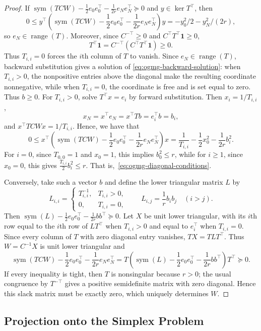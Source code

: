\documentclass[11pt]{article}
\begin{document}
\begin{proof}
If $\operatorname{sym}(TCW)-\frac12e_0e_0^\top
-\frac1{2r}e_Ne_N^\top \succeq0$ and $y\in\ker T^\top$, then
$$0\leq y^\top \left(\operatorname{sym}(TCW)-\frac12e_0e_0^\top
-\frac1{2r}e_Ne_N^\top\right)y=-y_0^2/2-y_N^2/(2r),$$
so $e_N\in\operatorname{range}(T)$.
Moreover, since $C^{-\top}\geq0$ and $C^\top T^\top\mathbf1\geq0$,
\[
    T^\top\mathbf1
    =C^{-\top}(C^\top T^\top\mathbf1)\geq0.
\]
Thus $T_{i,i}=0$ forces the $i$th column of $T$ to vanish. Since
$e_N\in\operatorname{range}(T)$, backward substitution gives a solution of
\eqref{eq:ogmg-backward-solution}: when $T_{i,i}>0$, the nonpositive
entries above the diagonal make the resulting coordinate nonnegative, while when
$T_{i,i}=0$, the coordinate is free and is set equal to zero. Thus $b\geq0$.
For $T_{i,i}>0$, solve $T^\top x=e_i$ by forward substitution. Then
$x_i=1/T_{i,i}$, 
$$x_N=x^\top e_N=x^\top Tb=e_i^\top b=b_i,$$
and $x^\top TCWx=1/T_{i,i}$. Hence, we have that
$$ 0 \leq x^\top\left(\operatorname{sym}(TCW)-\frac12e_0e_0^\top
-\frac1{2r}e_Ne_N^\top\right)x = \frac{1}{T_{i,i}} - \frac{1}{2}x_0^2 - \frac{1}{2r}b_i^2.$$
For $i=0$, since $T_{0,0}=1$ and $x_0=1$, this implies $b_0^2\leq r$, while for $i\geq 1$, since $x_0=0$, this gives $\frac{T_{i,i}}{2}b_i^2\leq r$. That is,~\eqref{eq:ogmg-diagonal-conditions}.

Conversely, take such a vector $b$ and define
the lower triangular matrix $L$ by
\[
 L_{i,i}=\begin{cases}T_{i,i}^{-1},&T_{i,i}>0,\\0,&T_{i,i}=0,\end{cases}
 \qquad
 L_{i,j}=\frac1r b_ib_j\quad(i>j).
\]
Then $\operatorname{sym}(L)-\frac12e_0e_0^\top
 -\frac1{2r}bb^\top\succeq0$.
Let $X$ be unit lower triangular, with its $i$th row equal to the $i$th row
of $LT^\top$ when $T_{i,i}>0$ and equal to $e_i^\top$ when $T_{i,i}=0$.
Since every column of $T$ with zero diagonal entry vanishes,
$TX=TLT^\top$. Thus $W=C^{-1}X$ is unit lower triangular and
\[
 \operatorname{sym}(TCW)-\frac12e_0e_0^\top
 -\frac1{2r}e_Ne_N^\top=T\left(\operatorname{sym}(L)-\frac12e_0e_0^\top
 -\frac1{2r}bb^\top\right)T^\top\succeq0.
\]
If every inequality is tight, then $T$ is nonsingular because $r>0$; the
usual congruence by $T^{-\top}$ gives a positive semidefinite matrix with
zero diagonal. Hence this slack matrix must be exactly zero, which uniquely determines $W$.
\end{proof}

\subsection{Projection onto the Simplex Problem}
\end{document}
